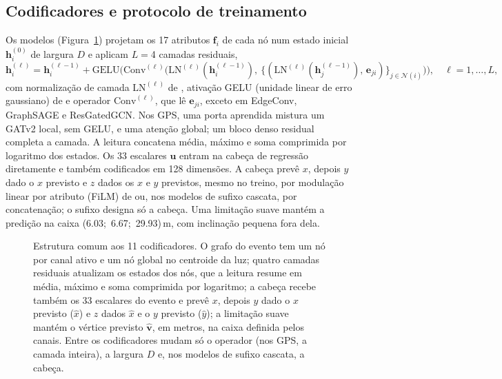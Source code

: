\subsection{Codificadores e protocolo de treinamento}
\label{sec:modelos}

Os modelos (Figura~\ref{fig:arquitetura}) projetam os \num{17} atributos $\mathbf{f}_i$ de cada nó num estado inicial $\mathbf{h}_i^{(0)}$ de largura $D$ e aplicam $L = {}$\num{4} camadas residuais,
\begin{equation}
  \mathbf{h}_i^{(\ell)} = \mathbf{h}_i^{(\ell-1)} + \mathrm{GELU}\Big(\mathrm{Conv}^{(\ell)}\big(\mathrm{LN}^{(\ell)}(\mathbf{h}_i^{(\ell-1)}),\ \{(\mathrm{LN}^{(\ell)}(\mathbf{h}_j^{(\ell-1)}),\, \mathbf{e}_{ji})\}_{j \in \mathcal{N}(i)}\big)\Big), \quad \ell = 1, \dots, L,
  \label{eq:camada}
\end{equation}
com normalização de camada $\mathrm{LN}^{(\ell)}$ de , ativação GELU (unidade linear de erro gaussiano) de  e operador $\mathrm{Conv}^{(\ell)}$, que lê $\mathbf{e}_{ji}$, exceto em EdgeConv, GraphSAGE e ResGatedGCN. Nos GPS, uma porta aprendida mistura um GATv2 local, sem GELU, e uma atenção global; um bloco denso residual completa a camada. A leitura concatena média, máximo e soma comprimida por logaritmo dos estados. Os \num{33} escalares $\mathbf{u}$ entram na cabeça de regressão diretamente e também codificados em \num{128} dimensões. A cabeça prevê $x$, depois $y$ dado o $x$ previsto e $z$ dados os $x$ e $y$ previstos, mesmo no treino, por modulação linear por atributo (FiLM) de  ou, nos modelos de sufixo cascata, por concatenação; o sufixo designa só a cabeça. Uma limitação suave mantém a predição na caixa \textpm(\num{6.03};~\num{6.67};~\num{29.93})\,\unit{\m}, com inclinação pequena fora dela.

\begin{figure}[H]
  \centering
  
  \caption{Estrutura comum aos \num{11} codificadores. O grafo do evento tem um nó por canal ativo e um nó global no centroide da luz; quatro camadas residuais atualizam os estados dos nós, que a leitura resume em média, máximo e soma comprimida por logaritmo; a cabeça recebe também os \num{33} escalares do evento e prevê $x$, depois $y$ dado o $x$ previsto ($\hat{x}$) e $z$ dados $\hat{x}$ e o $y$ previsto ($\hat{y}$); a limitação suave mantém o vértice previsto $\hat{\mathbf{v}}$, em metros, na caixa definida pelos canais. Entre os codificadores mudam só o operador (nos GPS, a camada inteira), a largura $D$ e, nos modelos de sufixo cascata, a cabeça.}
  \label{fig:arquitetura}
\end{figure}

